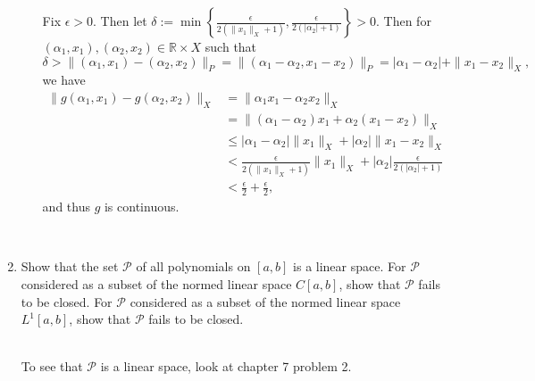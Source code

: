 \begin{enumerate}
\begin{enumerate}[(i)]
        Fix $\epsilon>0$. 
        Then let $\delta:=\min\left\{\frac{\epsilon}{2(\|x_1\|_X+1)},\frac{\epsilon}{2(|\alpha_2|+1)}\right\}>0$.
        Then for $(\alpha_1,x_1),(\alpha_2,x_2)\in \mathbb{R}\times X$ such that
        \[
           \delta> \|(\alpha_1,x_1)-(\alpha_2,x_2)\|_P=\|(\alpha_1-\alpha_2,x_1-x_2)\|_P=|\alpha_1-\alpha_2|+\|x_1-x_2\|_X,
        \]
        we have
        \[
            \begin{split}
            \|g(\alpha_1,x_1)-g(\alpha_2,x_2)\|_X
            &=\|\alpha_1 x_1-\alpha_2 x_2\|_X\\
            &=\|(\alpha_1 -\alpha_2)x_1+\alpha_2(x_1- x_2)\|_X\\
            &\le|\alpha_1 -\alpha_2|\|x_1\|_X+|\alpha_2|\|x_1- x_2\|_X\\
            &<\frac{\epsilon}{2(\|x_1\|_X+1)}\|x_1\|_X+|\alpha_2|\frac{\epsilon}{2(|\alpha_2|+1)}\\
            &<\frac{\epsilon}{2}+\frac{\epsilon}{2},
            \end{split}
        \]
        and thus $g$ is continuous.
    \end{enumerate} 
    \ \\\item Show that the set $\mathcal{P}$ of all polynomials on $[a,b]$ is a linear space.
    For $\mathcal{P}$ considered as a subset of the normed linear space $C[a,b]$, show that $\mathcal{P}$ fails to be closed.
    For $\mathcal{P}$ considered as a subset of the normed linear space $L^1[a,b]$, show that $\mathcal{P}$ fails to be closed.

    \ \\To see that $\mathcal{P}$ is a linear space, look at chapter 7 problem 2.
    

\end{enumerate}

